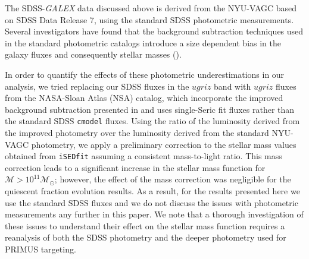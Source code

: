 \documentclass{emulateapj}
\begin{document}
The SDSS-{\em GALEX} data discussed above is derived from the NYU-VAGC
based on SDSS Data Release 7, using the standard SDSS photometric
measurements. Several investigators have found that the background
subtraction techniques used in the standard photometric catalogs
introduce a size dependent bias in the galaxy fluxes and consequently
stellar masses (\citealt{West:2005aa, Blanton:2005ab, Lauer:2007aa, Bernardi:2007aa,
  Hyde:2009aa, West:2010aa}).

In order to quantify the effects of these photometric underestimations
in our analysis, we tried replacing our SDSS fluxes in the $ugriz$
band with $ugriz$ fluxes from the NASA-Sloan Atlas (NSA) catalog,
which incorporate the improved background subtraction presented in
\cite{Blanton:2011aa} and uses single-Seric fit fluxes rather than the
standard SDSS \texttt{cmodel} fluxes. Using the ratio of the
luminosity derived from the improved photometry over the luminosity
derived from the standard NYU-VAGC photometry, we apply a preliminary
correction to the stellar mass values obtained from \texttt{iSEDfit}
assuming a consistent mass-to-light ratio. This mass correction leads
to a significant increase in the stellar mass function for
$\mathcal{M} > 10^{11} \mathcal{M}_{\odot}$; however, the effect of
the mass correction was negligible for the quiescent fraction
evolution results. As a result, for the results presented here we use
the standard SDSS fluxes and we do not discuss the issues with
photometric measurements any further in this paper. We note that a
thorough investigation of these issues to understand their effect on
the stellar mass function requires a reanalysis of both the SDSS
photometry and the deeper photometry used for PRIMUS targeting.
\end{document}
